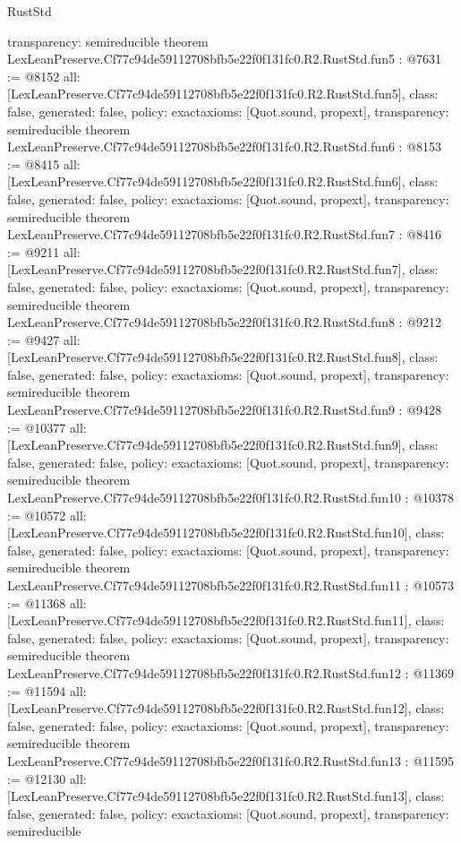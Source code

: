 \begin{lexlean}{RustStd}
\begin{coremodule}
{  transparency: semireducible
}
theorem LexLeanPreserve.Cf77c94de59112708bfb5e22f0f131fc0.R2.RustStd.fun5 : @7631 := @8152 {
  all: [LexLeanPreserve.Cf77c94de59112708bfb5e22f0f131fc0.R2.RustStd.fun5],
  class: false,
  generated: false,
  policy: exact{axioms: [Quot.sound, propext]},
  transparency: semireducible
}
theorem LexLeanPreserve.Cf77c94de59112708bfb5e22f0f131fc0.R2.RustStd.fun6 : @8153 := @8415 {
  all: [LexLeanPreserve.Cf77c94de59112708bfb5e22f0f131fc0.R2.RustStd.fun6],
  class: false,
  generated: false,
  policy: exact{axioms: [Quot.sound, propext]},
  transparency: semireducible
}
theorem LexLeanPreserve.Cf77c94de59112708bfb5e22f0f131fc0.R2.RustStd.fun7 : @8416 := @9211 {
  all: [LexLeanPreserve.Cf77c94de59112708bfb5e22f0f131fc0.R2.RustStd.fun7],
  class: false,
  generated: false,
  policy: exact{axioms: [Quot.sound, propext]},
  transparency: semireducible
}
theorem LexLeanPreserve.Cf77c94de59112708bfb5e22f0f131fc0.R2.RustStd.fun8 : @9212 := @9427 {
  all: [LexLeanPreserve.Cf77c94de59112708bfb5e22f0f131fc0.R2.RustStd.fun8],
  class: false,
  generated: false,
  policy: exact{axioms: [Quot.sound, propext]},
  transparency: semireducible
}
theorem LexLeanPreserve.Cf77c94de59112708bfb5e22f0f131fc0.R2.RustStd.fun9 : @9428 := @10377 {
  all: [LexLeanPreserve.Cf77c94de59112708bfb5e22f0f131fc0.R2.RustStd.fun9],
  class: false,
  generated: false,
  policy: exact{axioms: [Quot.sound, propext]},
  transparency: semireducible
}
theorem LexLeanPreserve.Cf77c94de59112708bfb5e22f0f131fc0.R2.RustStd.fun10 : @10378 := @10572 {
  all: [LexLeanPreserve.Cf77c94de59112708bfb5e22f0f131fc0.R2.RustStd.fun10],
  class: false,
  generated: false,
  policy: exact{axioms: [Quot.sound, propext]},
  transparency: semireducible
}
theorem LexLeanPreserve.Cf77c94de59112708bfb5e22f0f131fc0.R2.RustStd.fun11 : @10573 := @11368 {
  all: [LexLeanPreserve.Cf77c94de59112708bfb5e22f0f131fc0.R2.RustStd.fun11],
  class: false,
  generated: false,
  policy: exact{axioms: [Quot.sound, propext]},
  transparency: semireducible
}
theorem LexLeanPreserve.Cf77c94de59112708bfb5e22f0f131fc0.R2.RustStd.fun12 : @11369 := @11594 {
  all: [LexLeanPreserve.Cf77c94de59112708bfb5e22f0f131fc0.R2.RustStd.fun12],
  class: false,
  generated: false,
  policy: exact{axioms: [Quot.sound, propext]},
  transparency: semireducible
}
theorem LexLeanPreserve.Cf77c94de59112708bfb5e22f0f131fc0.R2.RustStd.fun13 : @11595 := @12130 {
  all: [LexLeanPreserve.Cf77c94de59112708bfb5e22f0f131fc0.R2.RustStd.fun13],
  class: false,
  generated: false,
  policy: exact{axioms: [Quot.sound, propext]},
  transparency: semireducible
}
\end{coremodule}
\end{lexlean}
